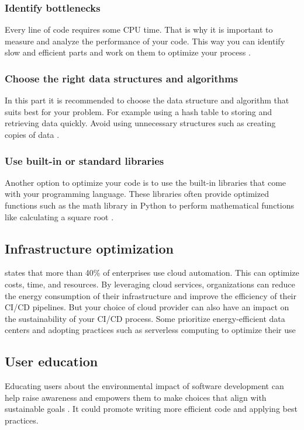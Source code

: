 \subsubsection{Identify bottlenecks}
Every line of code requires some CPU time. That is why it is important to measure and analyze the performance of your code. This way you can identify slow and efficient parts and work on them to optimize your process \autocite{Ojeda}.

\subsubsection{Choose the right data structures and algorithms}
In this part it is recommended to choose the data structure and algorithm that suits best for your problem. For example using a hash table to storing and retrieving data quickly. Avoid using unnecessary structures such as creating copies of data \autocite{Ojeda}.

\subsubsection{Use built-in or standard libraries}
Another option to optimize your code is to use the built-in libraries that come with your programming language. These libraries often provide optimized functions such as the math library in Python to perform mathematical functions like calculating a square root \autocite{Ojeda}.


\subsection{Infrastructure optimization} 
\textcite{Krivec2023} states that more than 40\% of enterprises use cloud automation. This can optimize costs, time, and resources. By leveraging cloud services, organizations can reduce the energy consumption of their infrastructure and improve the efficiency of their CI/CD pipelines.
But your choice of cloud provider can also have an impact on the sustainability of your CI/CD process. Some prioritize energy-efficient data centers and adopting practices such as serverless computing to optimize their use \autocite{Festus2024}


\subsection{User education}
Educating users about the environmental impact of software development can help raise awareness and empowers them to make choices that align with sustainable goals \autocite{Festus2024}. 
It could promote writing more efficient code and applying best practices.


